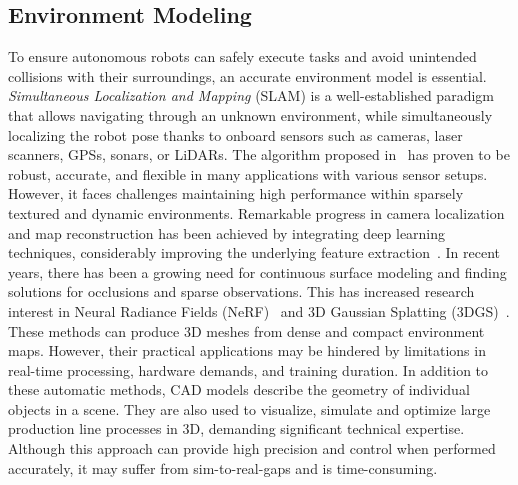 \subsection{Environment Modeling}
To ensure autonomous robots can safely execute tasks and avoid unintended collisions with their surroundings, 
an accurate environment model is essential.
\emph{Simultaneous Localization and Mapping} (SLAM) is a well-established paradigm 
that allows navigating through an unknown environment, 
while simultaneously localizing the robot pose thanks to onboard sensors such as
cameras, 
laser scanners, 
GPSs, 
sonars, 
or LiDARs.
The algorithm proposed in~\cite{campos2021orb} has proven to be robust, 
accurate, 
and flexible in many applications with various sensor setups. 
However, it faces challenges maintaining high performance within sparsely textured and dynamic environments. %
Remarkable progress in camera localization and map reconstruction has been achieved by integrating deep learning techniques, 
considerably improving the underlying feature extraction~\cite{tateno2017cnn, bloesch2018codeslam}. 
In recent years, 
there has been a growing need for continuous surface modeling and finding solutions for occlusions and sparse observations. 
This has increased research interest in Neural Radiance Fields (NeRF)~\cite{mildenhall2021nerf} and 3D Gaussian Splatting (3DGS)~\cite{kerbl20233d}. 
These methods can produce 3D meshes from dense and compact environment maps. 
However, 
their practical applications may be hindered by limitations in real-time processing, 
hardware demands, 
and training duration.
In addition to these automatic methods, 
CAD models describe the geometry of individual objects in a scene.
They are also used to visualize, 
simulate and optimize large production line processes in 3D,
demanding significant technical expertise.
Although this approach can provide high precision and control when performed accurately,
it may suffer from sim-to-real-gaps and is time-consuming.

